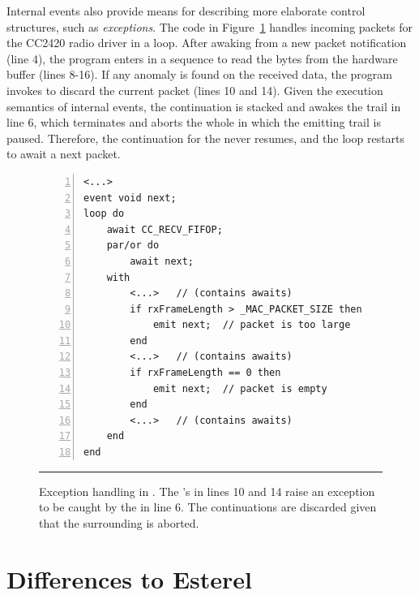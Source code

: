 Internal events also provide means for describing more elaborate control 
structures, such as \emph{exceptions}.
The code in Figure~\ref{lst.exception} handles incoming packets for the CC2420 
radio driver in a loop.
After awaking from a new packet notification (line 4), the program enters in a 
sequence to read the bytes from the hardware buffer (lines 8-16).
If any anomaly is found on the received data, the program invokes 
 to discard the current packet (lines 10 and 14).
Given the execution semantics of internal events, the  continuation 
is stacked and awakes the trail in line 6, which terminates and aborts the 
whole  in which the emitting trail is paused.
Therefore, the continuation for the  never resumes, and the loop 
restarts to await a next packet.


\begin{figure}[t]
\begin{lstlisting}[numbers=left,xleftmargin=2em]
<...>
event void next;
loop do
    await CC_RECV_FIFOP;
    par/or do
        await next;
    with
        <...>   // (contains awaits)
        if rxFrameLength > _MAC_PACKET_SIZE then
            emit next;  // packet is too large
        end
        <...>   // (contains awaits)
        if rxFrameLength == 0 then
            emit next;  // packet is empty
        end
        <...>   // (contains awaits)
    end
end
\end{lstlisting}
\rule{14cm}{0.37pt}
\caption{ Exception handling in \CEU. \newline
{\small
The 's in lines 10 and 14 raise an exception to be caught by the 
 in line 6.
The  continuations are discarded given that the surrounding 
 is aborted.
}
\label{lst.exception}
}
\end{figure}

\section{Differences to Esterel}
\label{sec.ceu.esterel}

